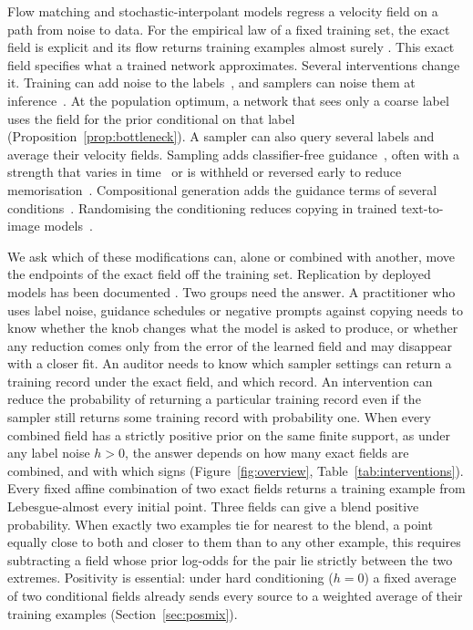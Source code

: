 \documentclass{article} %
\theoremstyle{plain}
\theoremstyle{definition}
\theoremstyle{remark}
\begin{document}
Flow matching and stochastic-interpolant models
\citep{lipman2023flow,albergo2023building,liu2023rectified,albergo2023stochastic}
regress a velocity field on a path from noise to data. For the empirical law of a fixed training
set, the exact field is explicit and its flow returns training examples almost surely
\citep{gu2023memorization,biroli2023diffusion,gao2024flow,bertrand2025closed}. This exact field
specifies what a trained network approximates. Several interventions change it. Training can
add noise to the labels~\citep{ho2022cascaded}, and samplers can noise them at
inference~\citep{sadat2024cads}. At the population optimum, a network that sees only a coarse label uses
the field for the prior conditional on that label (Proposition~\ref{prop:bottleneck}). A sampler
can also query several labels and average their velocity fields. Sampling adds classifier-free guidance~\citep{ho2022classifier}, often with a
strength that varies in time~\citep{kynkaanniemi2024interval} or is withheld or reversed early to
reduce memorisation~\citep{jain2025attraction}. Compositional generation adds the guidance terms
of several conditions~\citep{liu2022composable}. Randomising the conditioning reduces copying in
trained text-to-image models~\citep{somepalli2023copying}.

We ask which of these modifications can, alone or combined with another, move the endpoints of
the exact field off the training set. Replication by deployed models has been documented
\citep{carlini2023extracting,somepalli2023diffusion}. Two groups need the answer. A practitioner who uses label
noise, guidance schedules or negative prompts against copying needs to know whether the knob
changes what the model is asked to produce, or whether any reduction comes only from the error of
the learned field and may disappear with a closer fit. An auditor needs to know which sampler
settings can return a training record under the exact field, and which record. An intervention can
reduce the probability of returning a particular training record even if the sampler still returns
some training record with probability one. When every combined field has a strictly positive prior
on the same finite support, as under any label noise $h>0$, the answer depends on how many exact
fields are combined, and with which signs (Figure~\ref{fig:overview},
Table~\ref{tab:interventions}). Every fixed affine combination of two exact fields returns a
training example from Lebesgue-almost every initial point. Three fields can give a blend positive
probability. When exactly two examples tie for nearest to the blend, a point equally close to both
and closer to them than to any other example, this requires subtracting a field whose prior
log-odds for the pair lie strictly between the two extremes. Positivity is essential:
under hard conditioning ($h=0$) a fixed average of two conditional fields already sends every source to a
weighted average of their training examples (Section~\ref{sec:posmix}).
\end{document}
